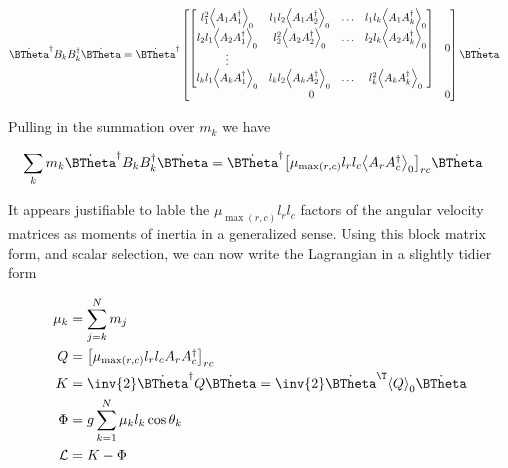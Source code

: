 \begin{align}\label{eqn:multiPendulumSpherical2:boo9}
\dot{\BTheta}^\dagger
B_k B_k^\dagger
\dot{\BTheta}
&=
\dot{\BTheta}^\dagger
\begin{bmatrix}
\begin{bmatrix}
l_1^2 \gpgradezero{A_1 A_1^\dagger} & l_1 l_2 \gpgradezero{A_1 A_2^\dagger} & \hdots & l_1 l_k \gpgradezero{A_1 A_k^\dagger} \\
l_2 l_1 \gpgradezero{A_2 A_1^\dagger} & l_2^2 \gpgradezero{A_2 A_2^\dagger} & \hdots & l_2 l_k \gpgradezero{A_2 A_k^\dagger} \\
\vdots \\
l_k l_1 \gpgradezero{A_k A_1^\dagger} & l_k l_2 \gpgradezero{A_k A_2^\dagger} & \hdots & l_k^2 \gpgradezero{A_k A_k^\dagger}
\end{bmatrix} & 0 \\
0 & 0
\end{bmatrix}
\dot{\BTheta}
\end{align}

Pulling in the summation over $m_k$ we have

\begin{align}\label{eqn:multiPendulumSpherical2:boo15}
\sum_k m_k
\dot{\BTheta}^\dagger
B_k B_k^\dagger
\dot{\BTheta}
&=
\dot{\BTheta}^\dagger
{\begin{bmatrix}
\mu_{\max(r,c)} l_r l_c \gpgradezero{A_r A_c^\dagger}
\end{bmatrix}}_{rc}
\dot{\BTheta}
\end{align}

It appears justifiable to lable the $\mu_{\max(r,c)} l_r l_c$ factors of the angular velocity matrices as moments of inertia in a generalized sense.  Using this block matrix form, and scalar selection, we can now write the Lagrangian in a slightly tidier form

\begin{align}\label{eqn:multiPendulumSpherical2:boo5}
\mu_k &= \sum_{j=k}^N m_j \\
Q &= 
{\begin{bmatrix}
\mu_{\max(r,c)} l_r l_c A_r A_c^\dagger
\end{bmatrix}}_{rc} \\
K &=
\inv{2} \dot{\BTheta}^\dagger Q
\dot{\BTheta} 
=\inv{2} \dot{\BTheta}^\T \gpgradezero{Q}
\dot{\BTheta} \\
\Phi &=
g \sum_{k=1}^N \mu_k l_k \cos\theta_k \\
\LL &= K - \Phi
\end{align}

